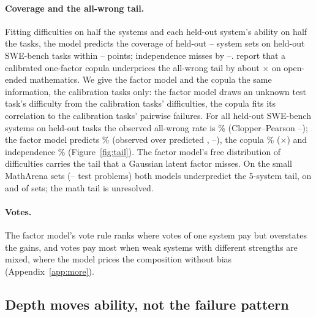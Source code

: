 \documentclass{article}
\begin{document}
\paragraph{Coverage and the all-wrong tail.} Fitting difficulties on half the systems and each held-out system's ability
on half the tasks, the model predicts the coverage of held-out -- system sets on held-out SWE-bench tasks within
-- points; independence misses by --.
\citet{chen2026cofailure} report that a calibrated one-factor copula underprices the all-wrong tail by about
$\times$
on open-ended mathematics. We give the factor model and the copula the same information, the calibration tasks only: the
factor model draws an unknown test task's difficulty from the calibration tasks' difficulties, the copula fits its
correlation to the calibration tasks' pairwise failures. For all  held-out SWE-bench systems on
 held-out tasks the observed all-wrong rate is \% (Clopper--Pearson
--); the factor model predicts \% (observed over predicted
, --), the copula \%
($\times$) and independence \% (Figure~\ref{fig:tail}). The factor model's free
distribution of difficulties carries the tail that a Gaussian latent factor misses. On the small MathArena sets
(-- test problems) both models underpredict the 5-system tail, on
 and  of  sets; the math tail is unresolved.

\paragraph{Votes.} The factor model's vote rule ranks where votes of one system pay but overstates the gains, and votes pay
most when weak systems with different strengths are mixed, where the model prices the composition without bias
(Appendix~\ref{app:more}).

\subsection{Depth moves ability, not the failure pattern}
\end{document}
